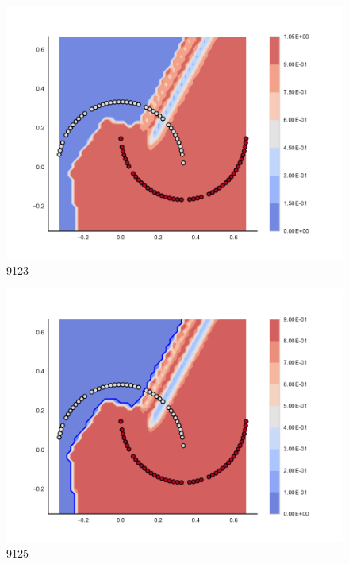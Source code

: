 \begin{subfigure}[b]{0.09\textwidth}
    \includegraphics[clip, trim=2.35cm 1.75cm 4.5cm 0cm,width=\textwidth]{img/convergence/9123.pdf}
    \caption{9123}
    \label{fig:convergence_9123}
\end{subfigure}
%
\begin{subfigure}[b]{0.09\textwidth}
    \includegraphics[clip, trim=2.35cm 1.75cm 4.5cm 0cm,width=\textwidth]{img/convergence/9125.pdf}
    \caption{9125}
    \label{fig:convergence_9125}
\end{subfigure}
%
